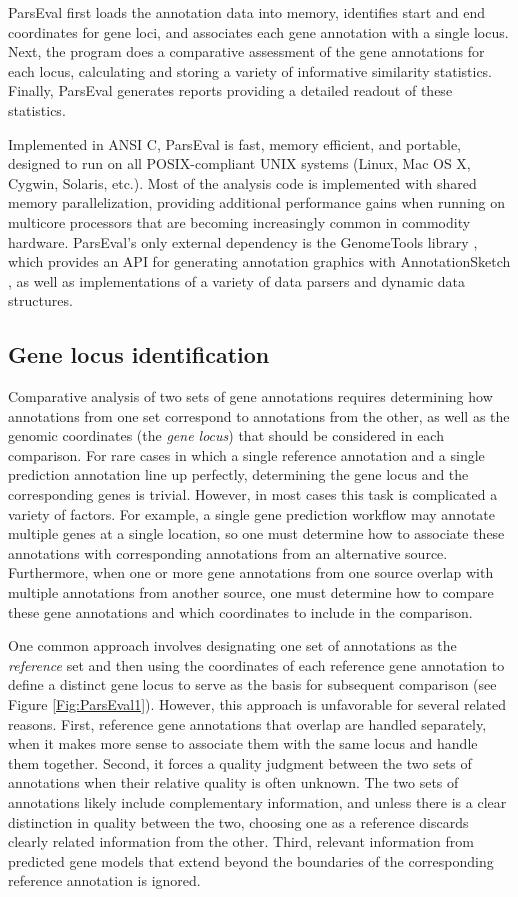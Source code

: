 ParsEval first loads the annotation data into memory, identifies start and end coordinates for gene loci, and associates each gene annotation with a single locus.
Next, the program does a comparative assessment of the gene annotations for each locus, calculating and storing a variety of informative similarity statistics.
Finally, ParsEval generates reports providing a detailed readout of these statistics.

Implemented in ANSI C, ParsEval is fast, memory efficient, and portable, designed to run on all POSIX-compliant UNIX systems (Linux, Mac OS X, Cygwin, Solaris, etc.).
Most of the analysis code is implemented with shared memory parallelization, providing additional performance gains when running on multicore processors that are becoming increasingly common in commodity hardware.
ParsEval's only external dependency is the GenomeTools library \citep{GenomeToolsWebsite}, which provides an API for generating annotation graphics with AnnotationSketch \citep{Steinbiss}, as well as implementations of a variety of data parsers and dynamic data structures.

\subsection{Gene locus identification}
Comparative analysis of two sets of gene annotations requires determining how annotations from one set correspond to annotations from the other, as well as the genomic coordinates (the \emph{gene locus}) that should be considered in each comparison.
For rare cases in which a single reference annotation and a single prediction annotation line up perfectly, determining the gene locus and the corresponding genes is trivial.
However, in most cases this task is complicated a variety of factors.
For example, a single gene prediction workflow may annotate multiple genes at a single location, so one must determine how to associate these annotations with corresponding annotations from an alternative source.
Furthermore, when one or more gene annotations from one source overlap with multiple annotations from another source, one must determine how to compare these gene annotations and which coordinates to include in the comparison.

One common approach involves designating one set of annotations as the \emph{reference} set and then using the coordinates of each reference gene annotation to define a distinct gene locus to serve as the basis for subsequent comparison (see Figure \ref{Fig:ParsEval1}).
However, this approach is unfavorable for several related reasons.
First, reference gene annotations that overlap are handled separately, when it makes more sense to associate them with the same locus and handle them together.
Second, it forces a quality judgment between the two sets of annotations when their relative quality is often unknown.
The two sets of annotations likely include complementary information, and unless there is a clear distinction in quality between the two, choosing one as a reference discards clearly related information from the other.
Third, relevant information from predicted gene models that extend beyond the boundaries of the corresponding reference annotation is ignored.


